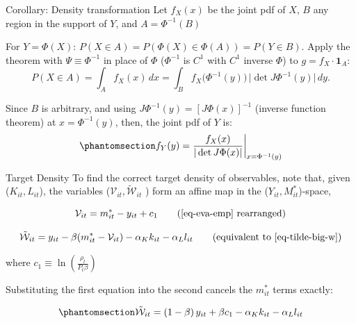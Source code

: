 \documentclass[
  ignorenonframetext,
  aspectratio=169,
]{beamer}
\begin{document}
\begin{frame}{Corollary: Density transformation}
\protect{}\label{corollary-density-transformation}
Let \(f_X(x)\) be the joint pdf of \(X\), \(B\) any region in the
support of \(Y\), and \(A=\Phi^{-1}(B)\)

For \(Y=\Phi(X)\): \(P(X\in A)=P(\Phi(X)\in\Phi(A))=P(Y\in B)\). Apply
the theorem with \(\Psi\equiv\Phi^{-1}\) in place of \(\Phi\)
(\(\Phi^{-1}\) is \(C^1\) with \(C^1\) inverse \(\Phi\)) to
\(g=f_X\cdot\mathbf 1_{A}\): \[
P(X\in A)=\int_{A}f_X(x)\,dx=\int_B f_X\big(\Phi^{-1}(y)\big)\,\big|\det J\Phi^{-1}(y)\big|\,dy.
\]

Since \(B\) is arbitrary, and using \(J\Phi^{-1}(y)=[J\Phi(x)]^{-1}\)
(inverse function theorem) at \(x=\Phi^{-1}(y)\), then, the joint pdf of
\(Y\) is: \begin{equation}\protect\phantomsection\label{eq-dens-trans}{
f_Y(y)=\frac{f_X(x)}{|\det J\Phi(x)|}\bigg|_{x=\Phi^{-1}(y)}
}\end{equation}
\end{frame}

\begin{frame}{Target Density}
\protect{}\label{target-density}
To find the correct target density of observables, note that, given
(\(K_{it},L_{it}\)), the variables
(\(\mathcal{V}_{it},\tilde{\mathcal{W}}_{it}\) ) form an affine map in
the (\(Y_{it},M^*_{it}\))-space,

\[
\mathcal V_{it}=m^*_{it}-y_{it}+c_1 \tag{\ref{eq-eva-emp} rearranged}
\]

\[
\tilde{\mathcal W}_{it}= y_{it}-\beta (m^*_{it}-\mathcal V_{it})-\alpha_Kk_{it}-\alpha_Ll_{it} \tag{equivalent to \ref{eq-tilde-big-w}}
\]

where \(c_1\equiv \ln\left(\frac{\rho_t}{P_t\beta}\right)\)

Substituting the first equation into the second cancels the \(m^*_{it}\)
terms exactly:

\begin{equation}\protect\phantomsection\label{eq-wtilde-reduced}{
\tilde{\mathcal W}_{it}=(1-\beta)\,y_{it}+\beta c_1-\alpha_Kk_{it}-\alpha_Ll_{it}
}\end{equation}
\end{frame}
\end{document}
